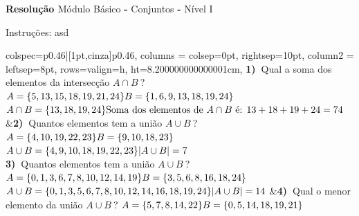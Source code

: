 \documentclass[12pt,twoside]{article}
\newcommand{\BI}[1]{\textbf{\textcolor{iris}{#1}}}
\newcommand{\BL}[1]{\textbf{\textcolor{laranja}{#1}}}
\newcommand{\BB}[1]{\textbf{\textcolor{babyblue}{#1}}}
\begin{document}
\newpage 
{} 
\normalsize 
\setlength{\tabcolsep}{0em} 
\setlength\parindent{0pt} 
\BB{\Large Resolução } \quad \footnotesize \textcolor{iris}{Módulo Básico} \BL{-} \textcolor{verde}{Conjuntos} \BL{-} Nível I
\vspace{0.3cm}
\small

\textcolor{laranja}{Instruções: } \textcolor{cinza}{asd}
\vspace{0.1cm}



\footnotesize
\begin{tblr}{
colspec={p{0.46\textwidth}|[1pt,cinza]p{0.46\textwidth}},
columns = {colsep=0pt, rightsep=10pt},
column{2} = {leftsep=8pt},
rows={valign=h, ht=8.200000000000001cm},
}
\BI{1)~}{Qual a soma dos elementos da intersecção \(A \cap B ~\)?}\vspace{5px}  \newline 
{ $A=\{5,13,15,18,19,21,24\}\newline B=\{1,6,9,13,18,19,24\}$} \vspace{5px} \newline 
{$A \cap B = \{13,18,19,24\} \\\text{Soma dos elementos de}~ A \cap B \text{ é: } \\13+18+19+24=74$} &\BI{2)~}{Quantos elementos tem a união \(A \cup B ~\)?}\vspace{5px}  \newline 
{ $A=\{4,10,19,22,23\}\newline B=\{9,10,18,23\}$} \vspace{5px} \newline 
{$A \cup B = \{4,9,10,18,19,22,23\} \\|A \cup B|=7$} \\ 
\BI{3)~}{Quantos elementos tem a união \(A \cup B ~\)?}\vspace{5px}  \newline 
{ $A=\{0,1,3,6,7,8,10,12,14,19\}\newline B=\{3,5,6,8,16,18,24\}$} \vspace{5px} \newline 
{$A \cup B = \{0,1,3,5,6,7,8,10,12,14,16,18,19,24\} \\|A \cup B|=14$} &\BI{4)~}{Qual o menor elemento da união \(A \cup B ~\)?}\vspace{5px}  \newline 
{ $A=\{5,7,8,14,22\}\newline B=\{0,5,14,18,19,21\}$} \vspace{5px} \newline 

\end{tblr}
\end{document}

